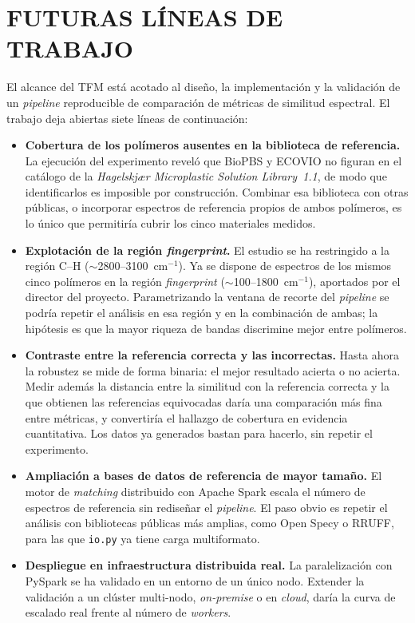 \chapter{FUTURAS LÍNEAS DE TRABAJO}

El alcance del TFM está acotado al diseño, la implementación y la validación de un \textit{pipeline} reproducible de comparación de métricas de similitud espectral. El trabajo deja abiertas siete líneas de continuación:

\begin{itemize}
    \item \textbf{Cobertura de los polímeros ausentes en la biblioteca de referencia.} La ejecución del experimento reveló que BioPBS y ECOVIO no figuran en el catálogo de la \emph{Hagelskjær Microplastic Solution Library~1.1}, de modo que identificarlos es imposible por construcción. Combinar esa biblioteca con otras públicas, o incorporar espectros de referencia propios de ambos polímeros, es lo único que permitiría cubrir los cinco materiales medidos.
    \item \textbf{Explotación de la región \textit{fingerprint}.} El estudio se ha restringido a la región C--H ($\sim$2800--3100~cm$^{-1}$). Ya se dispone de espectros de los mismos cinco polímeros en la región \textit{fingerprint} ($\sim$100--1800~cm$^{-1}$), aportados por el director del proyecto. Parametrizando la ventana de recorte del \textit{pipeline} se podría repetir el análisis en esa región y en la combinación de ambas; la hipótesis es que la mayor riqueza de bandas discrimine mejor entre polímeros.
    \item \textbf{Contraste entre la referencia correcta y las incorrectas.} Hasta ahora la robustez se mide de forma binaria: el mejor resultado acierta o no acierta. Medir además la distancia entre la similitud con la referencia correcta y la que obtienen las referencias equivocadas daría una comparación más fina entre métricas, y convertiría el hallazgo de cobertura en evidencia cuantitativa. Los datos ya generados bastan para hacerlo, sin repetir el experimento.
    \item \textbf{Ampliación a bases de datos de referencia de mayor tamaño.} El motor de \textit{matching} distribuido con Apache Spark escala el número de espectros de referencia sin rediseñar el \textit{pipeline}. El paso obvio es repetir el análisis con bibliotecas públicas más amplias, como Open Specy o RRUFF, para las que \texttt{io.py} ya tiene carga multiformato.
    \item \textbf{Despliegue en infraestructura distribuida real.} La paralelización con PySpark se ha validado en un entorno de un único nodo. Extender la validación a un clúster multi-nodo, \textit{on-premise} o en \textit{cloud}, daría la curva de escalado real frente al número de \textit{workers}.

\end{itemize}
